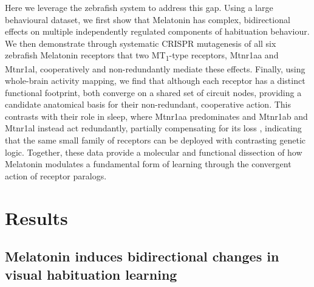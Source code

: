 \documentclass[9.5pt]{RandlettLab_elife}            %
\begin{document}
Here we leverage the zebrafish system to address this gap.
Using a large behavioural dataset, we first show that Melatonin has complex, bidirectional effects on multiple independently regulated components of habituation behaviour.
We then demonstrate through systematic CRISPR mutagenesis of all six zebrafish Melatonin receptors that two MT\textsubscript{1}-type receptors, Mtnr1aa and Mtnr1al, cooperatively and non-redundantly mediate these effects.
Finally, using whole-brain activity mapping, we find that although each receptor has a distinct functional footprint, both converge on a shared set of circuit nodes, providing a candidate anatomical basis for their non-redundant, cooperative action.
This contrasts with their role in sleep, where Mtnr1aa predominates and Mtnr1ab and Mtnr1al instead act redundantly, partially compensating for its loss \citep{Hill2026}, indicating that the same small family of receptors can be deployed with contrasting genetic logic.
Together, these data provide a molecular and functional dissection of how Melatonin modulates a fundamental form of learning through the convergent action of receptor paralogs.


\section{Results}

\subsection{Melatonin induces bidirectional changes in visual habituation learning}
\end{document}

